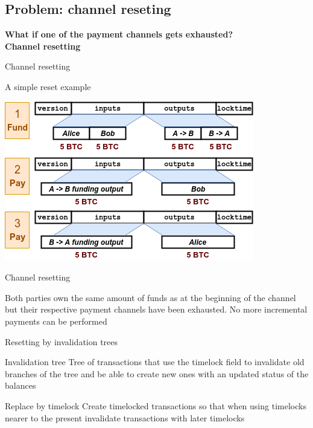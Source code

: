 \documentclass{beamer}
\begin{document}
\subsection{Problem: channel reseting}
\begin{frame}
 \begin{center}
  \textbf{What if one of the payment channels gets exhausted?}\\
  \pause
  \huge\textbf{Channel resetting}
 \end{center}
\end{frame}
\begin{frame}{Channel resetting}
 \begin{exampleblock}{A simple reset example}
  \begin{center}
   \includegraphics[width=\textwidth, height=0.8\textheight, keepaspectratio]{img/bidir_reset.png}
  \end{center}
 \end{exampleblock}
\end{frame}
\begin{frame}{Channel resetting}
 \begin{alertblock}
  Both parties own the same amount of funds as at the beginning of the channel but their respective payment channels have been exhausted. No more incremental payments can be performed
 \end{alertblock}
\end{frame}
\begin{frame}{Resetting by invalidation trees}
 \begin{block}{Invalidation tree}
  Tree of transactions that use the timelock field to invalidate old branches of the tree and be able to create new ones with an updated status of the balances
 \end{block}
 \pause
 \begin{block}{Replace by timelock}
  Create timelocked transactions so that when using timelocks nearer to the present invalidate transactions with later timelocks
 \end{block}
\end{frame}
\end{document}
